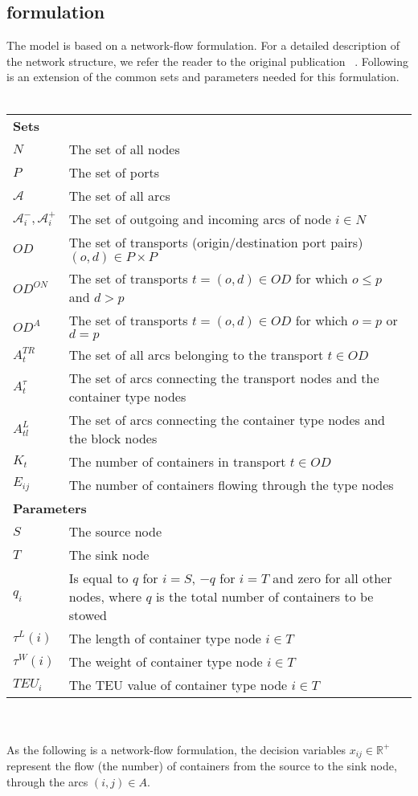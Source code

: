 \documentclass[preprint,12pt,authoryear]{elsarticle}
\begin{document}
\subsection{\citep{Chao2021} formulation}
The model is based on a network-flow formulation. For a detailed description of the network structure, we refer the reader to the original publication ~\citep{Chao2021}. Following is an extension of the common sets and parameters needed for this formulation.
\\\\
\begin{tabularx}{\linewidth}{lX}
    \multicolumn{2}{l}{{\bf Sets}}\\
    $N$ & The set of all nodes\\
    $P$ & The set of ports\\
    $\mathcal{A}$ & The set of all arcs\\
    $\mathcal{A}^-_i, \mathcal{A}^+_i$ & The set of outgoing and incoming arcs of node $i\in N$\\
    $OD$ & The set of transports (origin/destination port pairs) $(o,d) \in P \times P$ \\
    $OD^{ON}$ & The set of transports $t=(o,d) \in OD$ for which $o\leq p$ and $d>p$\\
    $OD^{A}$ & The set of transports $t=(o,d) \in OD$ for which $o=p$ or $d=p$\\
    $A^{TR}_{t}$ & The set of all arcs belonging to the transport $t \in OD$\\
    $A^{\tau}_t$ & The set of arcs connecting the transport nodes and the container type nodes\\
    $A^{L}_{tl}$ & The set of arcs connecting the container type nodes and the block nodes\\
    $K_t$ & The number of containers in transport $t\in OD$\\
    $E_{ij}$ & The number of containers flowing through the type nodes\\
    \multicolumn{2}{l}{{\bf Parameters}}\\
    $S$ & The source node\\
    $T$ & The sink node\\
    $q_i$ & Is equal to $q$ for $i=S$, $-q$ for $i=T$ and zero for all other nodes, where $q$ is the total number of containers to be stowed\\
    $\tau^L(i)$ & The length of container type node $i\in T$\\
    $\tau^W(i)$ & The weight of container type node $i\in T$\\
    $TEU_i$ & The TEU value of container type node $i\in T$\\
\end{tabularx}
\\\\
As the following is a network-flow formulation, the decision variables $x_{ij} \in \mathbb{R}^+$ represent the flow (the number) of containers from the source to the sink node, through the arcs $(i,j)\in A$.
\end{document}
